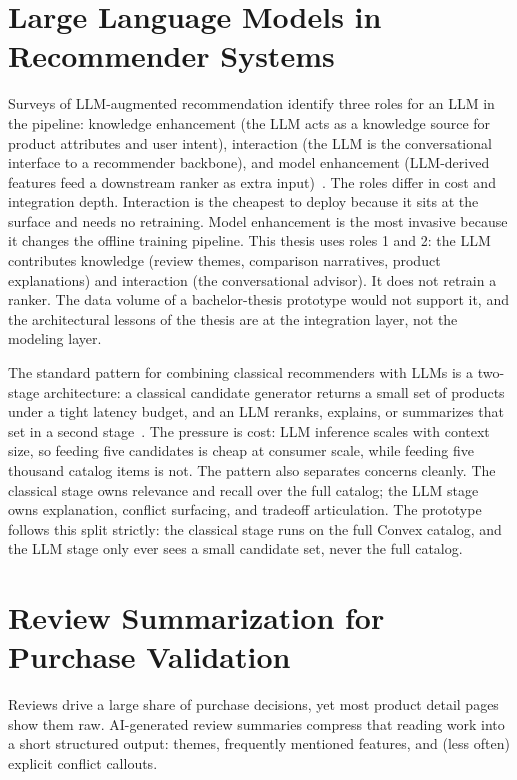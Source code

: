 \section{Large Language Models in Recommender Systems}
\label{sec:bg-llm-recsys}

Surveys of LLM-augmented recommendation identify three roles for
an LLM in the pipeline: knowledge enhancement (the LLM acts as a
knowledge source for product attributes and user intent),
interaction (the LLM is the conversational interface to a
recommender backbone), and model enhancement (LLM-derived
features feed a downstream ranker as extra
input)~\cite{LLMEnhancedRecSys2024}. The roles differ in cost and
integration depth. Interaction is the cheapest to deploy because
it sits at the surface and needs no retraining. Model enhancement
is the most invasive because it changes the offline training
pipeline. This thesis uses roles 1 and 2: the LLM contributes
knowledge (review themes, comparison narratives, product
explanations) and interaction (the conversational advisor). It
does not retrain a ranker. The data volume of a bachelor-thesis
prototype would not support it, and the architectural lessons of
the thesis are at the integration layer, not the modeling layer.

The standard pattern for combining classical recommenders with
LLMs is a two-stage architecture: a classical candidate generator
returns a small set of products under a tight latency budget, and
an LLM reranks, explains, or summarizes that set in a second
stage~\cite{HSTU2024, ShopifyHSTU}. The pressure is cost: LLM
inference scales with context size, so feeding five candidates is
cheap at consumer scale, while feeding five thousand catalog items
is not. The pattern also separates concerns cleanly. The
classical stage owns relevance and recall over the full catalog;
the LLM stage owns explanation, conflict surfacing, and tradeoff
articulation. The prototype follows this split strictly: the
classical stage runs on the full Convex catalog, and the LLM
stage only ever sees a small candidate set, never the full
catalog.

\section{Review Summarization for Purchase Validation}
\label{sec:bg-review-summarization}

Reviews drive a large share of purchase decisions, yet most
product detail pages show them raw. AI-generated review summaries
compress that reading work into a short structured output:
themes, frequently mentioned features, and (less often) explicit
conflict callouts.

